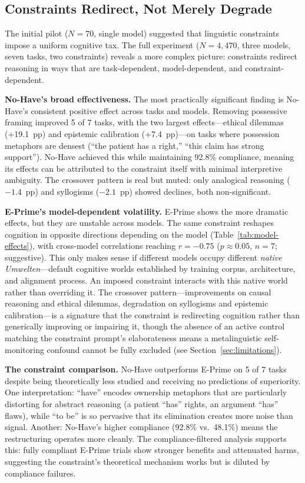 \documentclass[11pt,a4paper]{article}
\begin{document}
\subsection{Constraints Redirect, Not Merely Degrade}

The initial pilot ($N{=}70$, single model) suggested that linguistic constraints impose a uniform cognitive tax. The full experiment ($N{=}4{,}470$, three models, seven tasks, two constraints) reveals a more complex picture: constraints redirect reasoning in ways that are task-dependent, model-dependent, and constraint-dependent.

\textbf{No-Have's broad effectiveness.} The most practically significant finding is No-Have's consistent positive effect across tasks and models. Removing possessive framing improved 5 of 7 tasks, with the two largest effects---ethical dilemmas (+19.1~pp) and epistemic calibration (+7.4~pp)---on tasks where possession metaphors are densest (``the patient has a right,'' ``this claim has strong support''). No-Have achieved this while maintaining 92.8\% compliance, meaning its effects can be attributed to the constraint itself with minimal interpretive ambiguity. The crossover pattern is real but muted: only analogical reasoning ($-1.4$~pp) and syllogisms ($-2.1$~pp) showed declines, both non-significant.

\textbf{E-Prime's model-dependent volatility.} E-Prime shows the more dramatic effects, but they are unstable across models. The same constraint reshapes cognition in opposite directions depending on the model (Table~\ref{tab:model-effects}), with cross-model correlations reaching $r = -0.75$ ($p \approx 0.05$, $n = 7$; suggestive). This only makes sense if different models occupy different \emph{native Umwelten}---default cognitive worlds established by training corpus, architecture, and alignment process. An imposed constraint interacts with this native world rather than overriding it. The crossover pattern---improvements on causal reasoning and ethical dilemmas, degradation on syllogisms and epistemic calibration---is a signature that the constraint is redirecting cognition rather than generically improving or impairing it, though the absence of an active control matching the constraint prompt's elaborateness means a metalinguistic self-monitoring confound cannot be fully excluded (see Section~\ref{sec:limitations}).

\textbf{The constraint comparison.} No-Have outperforms E-Prime on 5 of 7 tasks despite being theoretically less studied and receiving no predictions of superiority. One interpretation: ``have'' encodes ownership metaphors that are particularly distorting for abstract reasoning (a patient ``has'' rights, an argument ``has'' flaws), while ``to be'' is so pervasive that its elimination creates more noise than signal. Another: No-Have's higher compliance (92.8\% vs.\ 48.1\%) means the restructuring operates more cleanly. The compliance-filtered analysis supports this: fully compliant E-Prime trials show stronger benefits and attenuated harms, suggesting the constraint's theoretical mechanism works but is diluted by compliance failures.
\end{document}
